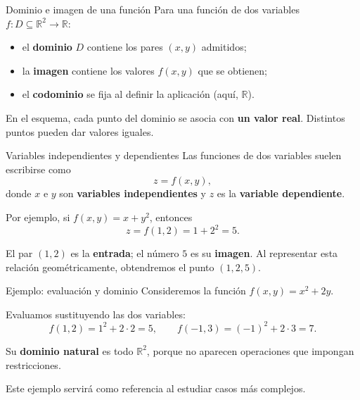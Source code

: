 \documentclass[main.tex]{subfiles}
\begin{document}
\begin{frame}{Dominio e imagen de una función}
Para una función de dos variables $f:D\subseteq\mathbb R^2\to\mathbb R$:
\begin{itemize}
\item el \textbf{dominio} $D$ contiene los pares $(x,y)$ admitidos;
\item la \textbf{imagen} contiene los valores $f(x,y)$ que se obtienen;
\item el \textbf{codominio} se fija al definir la aplicación (aquí, $\mathbb R$).
\end{itemize}
\vspace{-1mm}
\vspace{-2mm}
\small En el esquema, cada punto del dominio se asocia con \textbf{un valor real}. Distintos puntos pueden dar valores iguales.
\end{frame}
\begin{frame}{Variables independientes y dependientes}
Las funciones de dos variables suelen escribirse como
\[
z=f(x,y),
\]
donde $x$ e $y$ son \textbf{variables independientes} y $z$ es la \textbf{variable dependiente}.
\medskip

Por ejemplo, si $f(x,y)=x+y^2$, entonces
\[
z=f(1,2)=1+2^2=5.
\]
\medskip

El par $(1,2)$ es la \textbf{entrada}; el número $5$ es su \textbf{imagen}. Al representar esta relación geométricamente, obtendremos el punto $(1,2,5)$.
\end{frame}
\begin{frame}{Ejemplo: evaluación y dominio}
Consideremos la función $f(x,y)=x^2+2y$.
\medskip

Evaluamos sustituyendo las dos variables:
\[
f(1,2)=1^2+2\cdot2=5,\qquad
f(-1,3)=(-1)^2+2\cdot3=7.
\]
\medskip

Su \textbf{dominio natural} es todo $\mathbb R^2$, porque no aparecen operaciones que impongan restricciones.
\medskip

Este ejemplo servirá como referencia al estudiar casos más complejos.
\end{frame}
\end{document}
